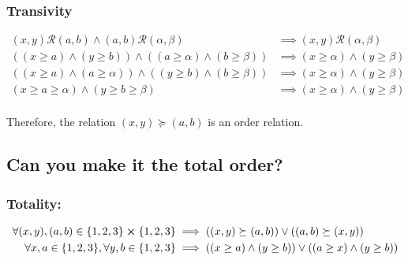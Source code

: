 \documentclass[]{article}
\newcommand{\Rel}{\mathcal{R}}
\begin{document}
\subsubsection{Transivity}
\begin{align*}
	(x,y) \Rel (a,b) \land (a,b) \Rel (\alpha,\beta) 
		&\implies (x,y) \Rel (\alpha,\beta)\\
	((x \geq a) \land (y \geq b)) \land ((a \geq \alpha) \land (b \geq \beta))
		&\implies (x \geq \alpha) \land (y \geq \beta)\\
	((x \geq a) \land (a \geq \alpha)) \land ((y \geq b) \land (b \geq \beta))
		&\implies (x \geq \alpha) \land (y \geq \beta)\\
	(x \geq a \geq \alpha) \land (y \geq b \geq \beta)
		&\implies (x \geq \alpha) \land (y \geq \beta)\\
\end{align*}

Therefore, the relation $(x,y) \succeq (a,b)$ is an order relation.

\subsection{Can you make it the total order?}

\subsubsection{Totality:}
\begin{align*}
	\forall (x,y),(a,b) \in \{1,2,3\} \cross \{1,2,3\}
		&\implies ((x,y) \succeq (a,b)) \lor ((a,b) \succeq (x,y))\\
	\forall x,a \in \{1,2,3\}, \forall y,b \in \{1,2,3\}
		&\implies ((x \geq a) \land (y \geq b)) \lor ((a \geq x) \land (y \geq b))
\end{align*}

\end{document}
